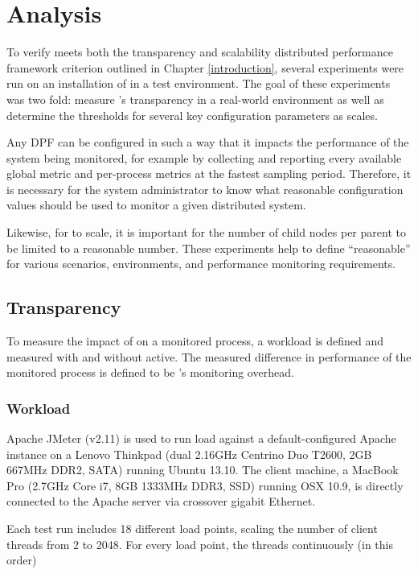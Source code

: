 \chapter{Analysis}
\label{analysis}

To verify \dcamp meets both the transparency and scalability distributed performance framework criterion outlined in
Chapter \ref{introduction}, several experiments were run on an installation of \dcamp in a test environment. The goal of
these experiments was two fold: measure \dcamp's transparency in a real-world environment as well as determine the
thresholds for several key configuration parameters as \dcamp scales.

Any DPF can be configured in such a way that it impacts the performance of the system being monitored, for example by
collecting and reporting every available global metric and per-process metrics at the fastest sampling period.
Therefore, it is necessary for the system administrator to know what reasonable configuration values should be used to
monitor a given distributed system.

Likewise, for \dcamp to scale, it is important for the number of child nodes per parent to be limited to a reasonable
number. These experiments help to define ``reasonable'' for various scenarios, environments, and performance monitoring
requirements.

\section{Transparency}

To measure the impact of \dcamp on a monitored process, a workload is defined and measured with and without \dcamp
active. The measured difference in performance of the monitored process is defined to be \dcamp's monitoring overhead.

\subsection{Workload}

Apache JMeter\cite{jmeter} (v2.11) is used to run load against a default-configured Apache instance on a Lenovo Thinkpad
(dual 2.16GHz Centrino Duo T2600, 2GB 667MHz DDR2, SATA) running Ubuntu 13.10. The client machine, a MacBook Pro (2.7GHz
Core i7, 8GB 1333MHz DDR3, SSD) running OSX 10.9, is directly connected to the Apache server via crossover gigabit
Ethernet.

Each test run includes 18 different load points, scaling the number of client threads from 2 to 2048. For every load
point, the threads continuously (in this order)

